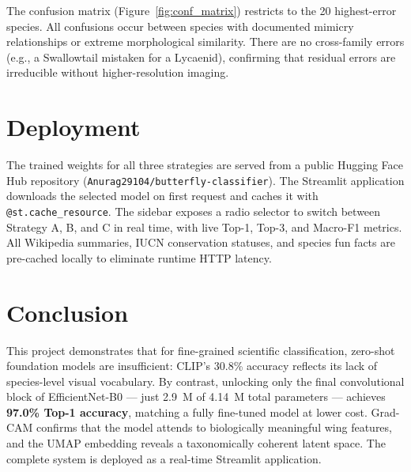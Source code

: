 \documentclass[journal, twocolumn]{IEEEtran}
\begin{document}
The confusion matrix (Figure~\ref{fig:conf_matrix}) restricts to the 20 highest-error species. All confusions occur between species with documented mimicry relationships or extreme morphological similarity. There are no cross-family errors (e.g., a Swallowtail mistaken for a Lycaenid), confirming that residual errors are irreducible without higher-resolution imaging.

\section{Deployment}

The trained weights for all three strategies are served from a public Hugging Face Hub repository (\texttt{Anurag29104/butterfly-classifier}). The Streamlit application downloads the selected model on first request and caches it with \texttt{@st.cache\_resource}. The sidebar exposes a radio selector to switch between Strategy A, B, and C in real time, with live Top-1, Top-3, and Macro-F1 metrics. All Wikipedia summaries, IUCN conservation statuses, and species fun facts are pre-cached locally to eliminate runtime HTTP latency.

\section{Conclusion}

This project demonstrates that for fine-grained scientific classification, zero-shot foundation models are insufficient: CLIP's 30.8\% accuracy reflects its lack of species-level visual vocabulary. By contrast, unlocking only the final convolutional block of EfficientNet-B0 — just 2.9~M of 4.14~M total parameters — achieves \textbf{97.0\% Top-1 accuracy}, matching a fully fine-tuned model at lower cost. Grad-CAM confirms that the model attends to biologically meaningful wing features, and the UMAP embedding reveals a taxonomically coherent latent space. The complete system is deployed as a real-time Streamlit application.
\end{document}
